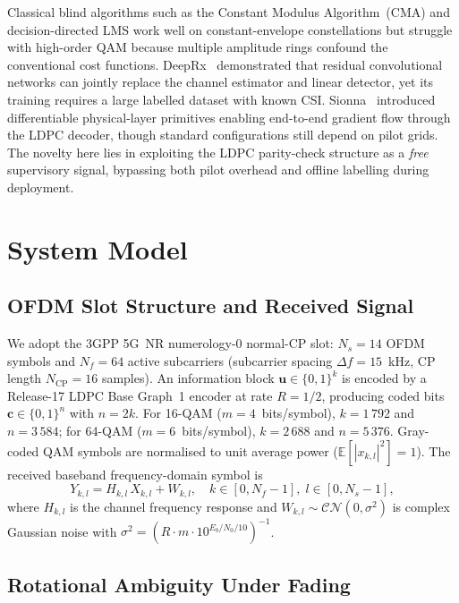\documentclass{ieeeaccess}
\begin{document}
Classical blind algorithms such as the Constant Modulus Algorithm~(CMA) and
decision-directed LMS work well on constant-envelope constellations but struggle with
high-order QAM because multiple amplitude rings confound the conventional cost functions.
DeepRx~\cite{honkala2021} demonstrated that residual convolutional networks can jointly
replace the channel estimator and linear detector, yet its training requires a large
labelled dataset with known CSI. Sionna~\cite{hoydis2022} introduced differentiable
physical-layer primitives enabling end-to-end gradient flow through the LDPC decoder,
though standard configurations still depend on pilot grids. The novelty here lies in
exploiting the LDPC parity-check structure as a \emph{free} supervisory signal, bypassing
both pilot overhead and offline labelling during deployment.

\section{System Model}\label{sec:system}

\subsection{OFDM Slot Structure and Received Signal}

We adopt the 3GPP 5G~NR numerology-0 normal-CP slot: $N_s=14$ OFDM symbols and
$N_f=64$ active subcarriers (subcarrier spacing $\Delta f=15$~kHz, CP length
$N_{\text{CP}}=16$ samples). An information block $\mathbf{u}\in\{0,1\}^k$ is encoded
by a Release-17 LDPC Base Graph~1 encoder at rate $R=1/2$, producing coded bits
$\mathbf{c}\in\{0,1\}^n$ with $n=2k$. For 16-QAM ($m=4$~bits/symbol), $k=1\,792$
and $n=3\,584$; for 64-QAM ($m=6$~bits/symbol), $k=2\,688$ and $n=5\,376$.
Gray-coded QAM symbols are normalised to unit average power
($\mathbb{E}[|x_{k,l}|^2]=1$). The received baseband frequency-domain symbol is
\begin{equation}\label{eq:channel}
  Y_{k,l} = H_{k,l}\,X_{k,l} + W_{k,l},
  \quad k\in[0,N_f\!-\!1],\; l\in[0,N_s\!-\!1],
\end{equation}
where $H_{k,l}$ is the channel frequency response and
$W_{k,l}\!\sim\!\mathcal{CN}(0,\sigma^2)$ is complex Gaussian noise with
$\sigma^2 = (R\cdot m\cdot 10^{E_b/N_0/10})^{-1}$.

\subsection{Rotational Ambiguity Under Fading}
\end{document}
